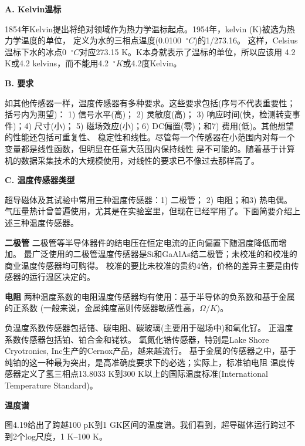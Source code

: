 \textbf{A. Kelvin温标}

1854年Kelvin提出将绝对领域作为热力学温标起点。1954年，kelvin (K)被选为热力学温度的单位，
定义为水的三相点温度(0.0100 $\ ^\circ C$)的1/273.16。
这样，Celsius温标下水的冰点0 $\ ^\circ C$对应273.15 K。K本身就表示了温标的单位，所以应该用
4.2 K或4.2 kelvins，而不能用4.2 $\ ^\circ K$或4.2度Kelvin。

\textbf{B. 要求}

如其他传感器一样，温度传感器有多种要求。这些要求包括(序号不代表重要性；括号内为期望)：
1) 信号水平(高)； 2) 灵敏度(高)； 3) 响应时间(快，检测转变事件)；4) 尺寸(小)；
5) 磁场效应(小)；6) DC偏置(零)；和7) 费用(低)。其他想望的性能还包括可重复性、
稳定性和线性。尽管每一个传感器在小范围内对每一个变量都是线性函数，但明显在任意大范围内保持线性
是不可能的。随着基于计算机的数据采集技术的大规模使用，对线性的要求已不像过去那样高了。

\textbf{C. 温度传感器类型}

超导磁体及其试验中常用三种温度传感器：1) 二极管； 2) 电阻；和3) 热电偶。
气压量热计曾普遍使用，尤其是在实验室里，但现在已经罕用了。下面简要介绍上述三种温度传感器。

\textbf{二极管} 二极管等半导体器件的结电压在恒定电流的正向偏置下随温度降低而增加。
最广泛使用的二极管温度传感器是Si和GaAlAs结二极管；未校准的和校准的商业温度传感器均可购得。
校准的要比未校准的贵约4倍，价格的差异主要是由传感器的运行温区决定的。

\textbf{电阻} 两种温度系数的电阻温度传感器均有使用：基于半导体的负系数和基于金属的正系数
(一般来说，金属纯度高则传感器敏感性高，$\Omega/K$)。

负温度系数传感器包括锗、碳电阻、碳玻璃(主要用于磁场中)和氧化钌。
正温度系数传感器包括铂、铂合金和铑铁。
氧氮化锆传感器，特别是Lake Shore Cryotronics, Inc生产的Cernox产品，越来越流行。
基于金属的传感器之中，基于纯铂的这一种最为突出，是高准确度要求下的必选；实际上，标准铂电阻
温度传感器定义了氢三相点13.8033 K到300 K以上的国际温度标准(International Temperature Standard)。

\textbf{温度谱}

图4.19给出了跨越100 pK到1 GK区间的温度谱。我们看到，超导磁体运行跨过不到2个log尺度，1 K–100 K。

